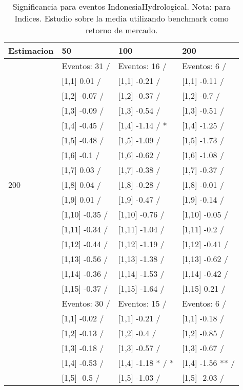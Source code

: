 \begin{table}

\caption{Significancia para eventos IndonesiaHydrological. Nota: para Indices. Estudio sobre la media utilizando benchmark como retorno de mercado.}
\centering
\begin{tabular}[t]{llll}
\toprule
Estimacion & 50 & 100 & 200\\
\midrule
 & Eventos:  31 / & Eventos:  16 / & Eventos:  6 /\\
 & {}[1,1] 0.01  / & {}[1,1] -0.21  / & {}[1,1] -0.11  /\\
 & {}[1,2] -0.07  / & {}[1,2] -0.37  / & {}[1,2] -0.7  /\\
 & {}[1,3] -0.09  / & {}[1,3] -0.54  / & {}[1,3] -0.51  /\\
 & {}[1,4] -0.45  / & {}[1,4] -1.14  / * & {}[1,4] -1.25  /\\
\addlinespace
 & {}[1,5] -0.48  / & {}[1,5] -1.09  / & {}[1,5] -1.73  /\\
 & {}[1,6] -0.1  / & {}[1,6] -0.62  / & {}[1,6] -1.08  /\\
 & {}[1,7] 0.03  / & {}[1,7] -0.38  / & {}[1,7] -0.37  /\\
200 & {}[1,8] 0.04  / & {}[1,8] -0.28  / & {}[1,8] -0.01  /\\
 & {}[1,9] 0.01  / & {}[1,9] -0.47  / & {}[1,9] -0.14  /\\
\addlinespace
 & {}[1,10] -0.35  / & {}[1,10] -0.76  / & {}[1,10] -0.05  /\\
 & {}[1,11] -0.34  / & {}[1,11] -1.04  / & {}[1,11] -0.2  /\\
 & {}[1,12] -0.44  / & {}[1,12] -1.19  / & {}[1,12] -0.41  /\\
 & {}[1,13] -0.56  / & {}[1,13] -1.38  / & {}[1,13] -0.62  /\\
 & {}[1,14] -0.36  / & {}[1,14] -1.53  / & {}[1,14] -0.42  /\\
\addlinespace
 & {}[1,15] -0.37  / & {}[1,15] -1.64  / & {}[1,15] 0.21  /\\
 & Eventos:  30 / & Eventos:  15 / & Eventos:  6 /\\
 & {}[1,1] -0.02  / & {}[1,1] -0.21  / & {}[1,1] -0.18  /\\
 & {}[1,2] -0.13  / & {}[1,2] -0.4  / & {}[1,2] -0.85  /\\
 & {}[1,3] -0.18  / & {}[1,3] -0.57  / & {}[1,3] -0.67  /\\
\addlinespace
 & {}[1,4] -0.53  / & {}[1,4] -1.18 * / * & {}[1,4] -1.56 ** /\\
 & {}[1,5] -0.5  / & {}[1,5] -1.03  / & {}[1,5] -2.03  /\\

\end{tabular}
\end{table}
